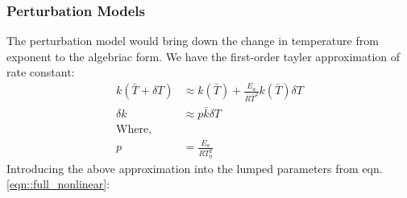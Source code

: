 \subsubsection{Perturbation Models}
The perturbation model would bring down the change in
temperature from exponent to the algebriac form. We have the first-order tayler
approximation of rate constant:
\begin{align*}
    k(\bar T + \delta T) &\approx k(\bar T) + \frac{E_a}{R\bar T^2} k(\bar T) \delta T\\
    \delta k &\approx p \bar k \delta T\\
    \text{Where,} \quad &\\
    p &= \frac{E_a}{RT_0^2}
\end{align*}
Introducing the above approximation into the lumped parameters from eqn.\ref{eqn::full_nonlinear}:
